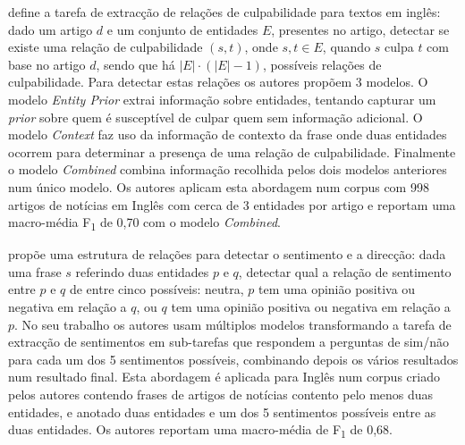\documentclass[a4paper, twocolumn, 11pt, twoside]{article}
\begin{document}
\cite{liang2019blames} define a tarefa de extracção de relações de culpabilidade para textos em inglês: dado um artigo $d$ e um conjunto de entidades $E$, presentes no artigo, detectar se existe uma relação de culpabilidade $(s,t)$, onde $s,t \in E$, quando $s$ culpa $t$ com base no artigo $d$, sendo que há $\lvert{E}\rvert \cdot (\lvert{E}\rvert - 1)$, possíveis relações de culpabilidade. Para detectar estas relações os autores propõem 3 modelos. O modelo \textit{Entity Prior} extrai informação sobre entidades, tentando capturar um \textit{prior} sobre quem é susceptível de culpar quem sem informação adicional. O modelo \textit{Context} faz uso da informação de contexto da frase onde duas entidades ocorrem para determinar a presença de uma relação de culpabilidade. Finalmente o modelo \textit{Combined} combina informação recolhida pelos dois modelos anteriores num único modelo. Os autores aplicam esta abordagem num corpus com 998 artigos de notícias em Inglês com cerca de 3 entidades por artigo e reportam uma macro-média F\textsubscript{1} de 0,70 com o modelo \textit{Combined}.

\cite{park-etal-2021-blames} propõe uma estrutura de relações para detectar o sentimento e a direcção: dada uma frase $s$ referindo duas entidades $p$ e $q$, detectar qual a relação de sentimento entre $p$ e $q$ de entre cinco possíveis: neutra, $p$ tem uma opinião positiva ou negativa em relação a $q$, ou $q$ tem uma opinião positiva ou negativa em relação a $p$. No seu trabalho os autores usam múltiplos modelos transformando a tarefa de extracção de sentimentos em sub-tarefas que respondem a perguntas de sim/não para cada um dos 5 sentimentos possíveis, combinando depois os vários resultados num resultado final. Esta abordagem é aplicada para Inglês num corpus criado pelos autores contendo frases de artigos de notícias contento pelo menos duas entidades, e anotado duas entidades e um dos 5 sentimentos possíveis entre as duas entidades. Os autores reportam uma macro-média de F\textsubscript{1} de 0,68.
\end{document}
